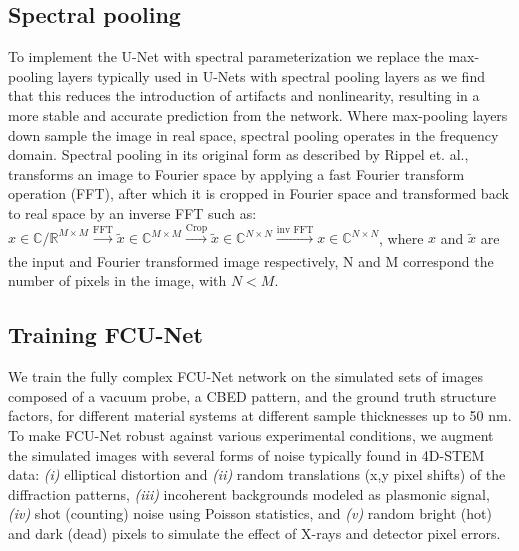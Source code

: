 \documentclass[%
 reprint,
superscriptaddress,
 amsmath,
 amssymb,
 prl,
]{revtex4-2}
\begin{document}
\subsection*{Spectral pooling}

To implement the U-Net with spectral parameterization we replace the max-pooling layers typically used in U-Nets with spectral pooling layers as we find that this reduces the introduction of artifacts and nonlinearity, resulting in a more stable and accurate prediction from the network. Where max-pooling layers down sample the image in real space, spectral pooling operates in the frequency domain. Spectral pooling in its original form as described by Rippel et. al., \cite{rippel2015spectral} transforms an image to Fourier space by applying a fast Fourier transform operation (FFT), after which it is cropped in Fourier space and transformed back to real space by an inverse FFT such as:
$x \in \mathbb{C/R}^{M \times {M}}  \xrightarrow[]{\text{FFT}} \tilde{x} \in \mathbb{C}^{M \times {M}}  \xrightarrow[]{\text{Crop}} \tilde{x} \in \mathbb{C}^{N \times {N}}  \xrightarrow[]{\text{inv FFT}} x \in \mathbb{C}^{N \times {N}}$, where $x$ and $\tilde{x}$ are the input and Fourier transformed image respectively, N and M correspond the number of pixels in the image, with $N < M$. 



\subsection*{Training FCU-Net}


We train the fully complex FCU-Net network on the simulated sets of images composed of a vacuum probe, a CBED pattern, and the ground truth structure factors, for different material systems at different sample thicknesses up to 50 nm. To make FCU-Net robust against various experimental conditions, we augment the simulated images with several forms of noise typically found in 4D-STEM data: \textit{(i)} elliptical distortion and \textit{(ii)} random translations (x,y pixel shifts) of the diffraction patterns, \textit{(iii)} incoherent backgrounds modeled as plasmonic signal, \textit{(iv)} shot (counting) noise using Poisson statistics, and \textit{(v)} random bright (hot) and dark (dead) pixels to simulate the effect of X-rays and detector pixel errors.
\end{document}
